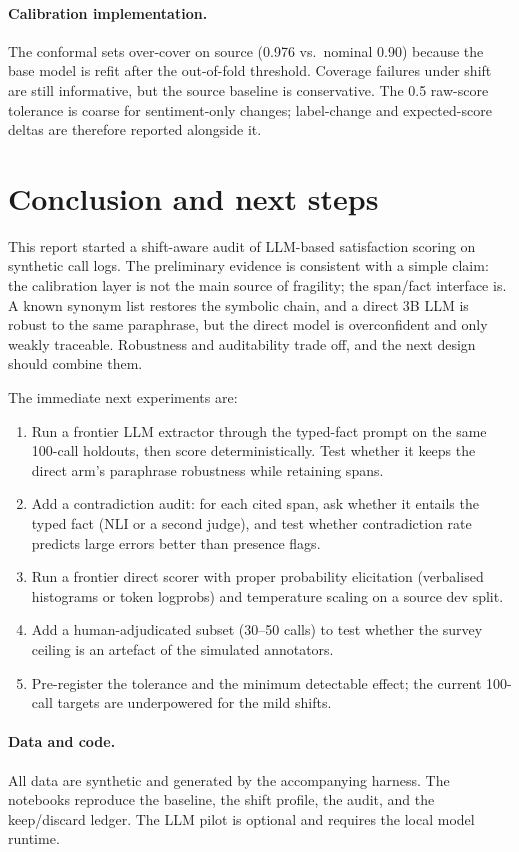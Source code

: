 \documentclass[11pt,a4paper]{article}
\begin{document}
\paragraph{Calibration implementation.}
The conformal sets over-cover on source (0.976 vs.\ nominal 0.90) because the base model is
refit after the out-of-fold threshold. Coverage failures under shift are still informative, but
the source baseline is conservative. The 0.5 raw-score tolerance is coarse for sentiment-only
changes; label-change and expected-score deltas are therefore reported alongside it.

\section{Conclusion and next steps}

This report started a shift-aware audit of LLM-based satisfaction scoring on synthetic call
logs. The preliminary evidence is consistent with a simple claim: the calibration layer is not
the main source of fragility; the span/fact interface is. A known synonym list restores the
symbolic chain, and a direct 3B LLM is robust to the same paraphrase, but the direct model is
overconfident and only weakly traceable. Robustness and auditability trade off, and the next
design should combine them.

The immediate next experiments are:
\begin{enumerate}[leftmargin=1.4em,itemsep=0.25em]
\item Run a frontier LLM extractor through the typed-fact prompt on the same 100-call holdouts,
then score deterministically. Test whether it keeps the direct arm's paraphrase robustness while
retaining spans.
\item Add a contradiction audit: for each cited span, ask whether it entails the typed fact
(NLI or a second judge), and test whether contradiction rate predicts large errors better than
presence flags.
\item Run a frontier direct scorer with proper probability elicitation (verbalised histograms or
token logprobs) and temperature scaling on a source dev split.
\item Add a human-adjudicated subset (30--50 calls) to test whether the survey ceiling is an
artefact of the simulated annotators.
\item Pre-register the tolerance and the minimum detectable effect; the current 100-call targets
are underpowered for the mild shifts.
\end{enumerate}

\paragraph{Data and code.}
All data are synthetic and generated by the accompanying harness. The notebooks reproduce the
baseline, the shift profile, the audit, and the keep/discard ledger. The LLM pilot is optional and
requires the local model runtime.



\end{document}

